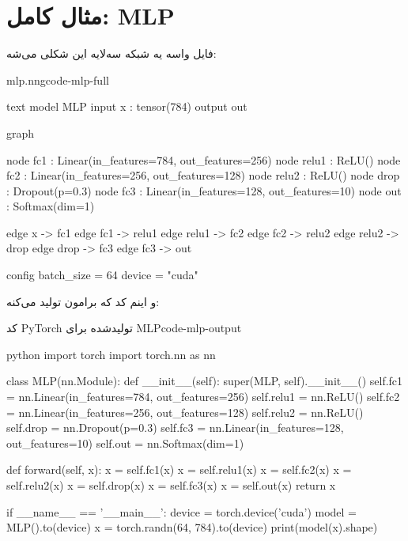 \documentclass{nngraph-fa}
\begin{document}
\section{مثال کامل: MLP}

فایل  واسه یه شبکه سه‌لایه این شکلی می‌شه:

\begin{codebox}{mlp.nng}{code-mlp-full}
\begin{amzcode}{text}
model MLP {
    input  x   : tensor(784)
    output out
}

graph {
    node fc1   : Linear(in_features=784, out_features=256)
    node relu1 : ReLU()
    node fc2   : Linear(in_features=256, out_features=128)
    node relu2 : ReLU()
    node drop  : Dropout(p=0.3)
    node fc3   : Linear(in_features=128, out_features=10)
    node out   : Softmax(dim=1)

    edge x     -> fc1
    edge fc1   -> relu1
    edge relu1 -> fc2
    edge fc2   -> relu2
    edge relu2 -> drop
    edge drop  -> fc3
    edge fc3   -> out
}

config {
    batch_size = 64
    device = "cuda"
}
\end{amzcode}
\end{codebox}

و اینم کد  که برامون تولید می‌کنه:

\begin{codebox}{کد PyTorch تولیدشده برای MLP}{code-mlp-output}
\begin{amzcode}{python}
import torch
import torch.nn as nn


class MLP(nn.Module):
    def __init__(self):
        super(MLP, self).__init__()
        self.fc1   = nn.Linear(in_features=784, out_features=256)
        self.relu1 = nn.ReLU()
        self.fc2   = nn.Linear(in_features=256, out_features=128)
        self.relu2 = nn.ReLU()
        self.drop  = nn.Dropout(p=0.3)
        self.fc3   = nn.Linear(in_features=128, out_features=10)
        self.out   = nn.Softmax(dim=1)

    def forward(self, x):
        x = self.fc1(x)
        x = self.relu1(x)
        x = self.fc2(x)
        x = self.relu2(x)
        x = self.drop(x)
        x = self.fc3(x)
        x = self.out(x)
        return x


if __name__ == '__main__':
    device = torch.device('cuda')
    model  = MLP().to(device)
    x      = torch.randn(64, 784).to(device)
    print(model(x).shape)
\end{amzcode}
\end{codebox}
\end{document}
